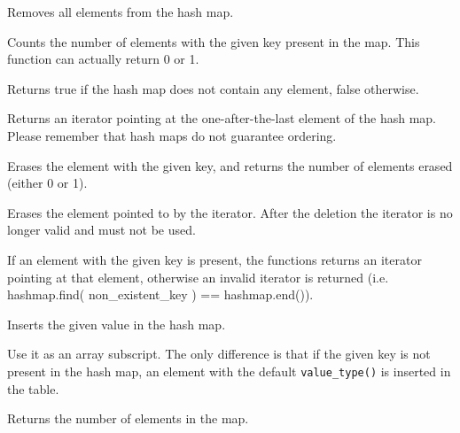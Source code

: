 
Removes all elements from the hash map.

\label{wxhashmapcount}


Counts the number of elements with the given key present in the map.
This function can actually return 0 or 1.

\label{wxhashmapempty}


Returns true if the hash map does not contain any element, false otherwise.

\label{wxhashmapend}



Returns an iterator pointing at the one-after-the-last element of the hash map.
Please remember that hash maps do not guarantee ordering.

\label{wxhashmaperase}


Erases the element with the given key, and returns the number of elements
erased (either 0 or 1).



Erases the element pointed to by the iterator. After the deletion
the iterator is no longer valid and must not be used.

\label{wxhashmapfind}



If an element with the given key is present, the functions returns
an iterator pointing at that element, otherwise an invalid iterator
is returned (i.e. hashmap.find( non\_existent\_key ) == hashmap.end()).

\label{wxhashmapinsert}


Inserts the given value in the hash map.

\label{wxhashmapbracket}


Use it as an array subscript. The only difference is that if the
given key is not present in the hash map, an element with the
default {\tt value\_type()} is inserted in the table.

\label{wxhashmapsize}


Returns the number of elements in the map.


